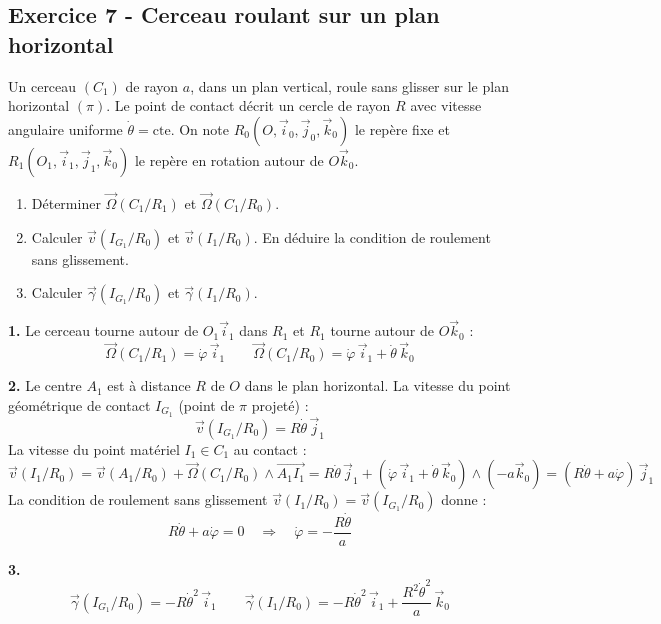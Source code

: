 \documentclass[12pt,a4paper]{article}
\begin{document}
\subsection*{Exercice 7 - Cerceau roulant sur un plan horizontal \niveau{\difficile}}

\begin{boiteexercice}
Un cerceau $(C_1)$ de rayon $a$, dans un plan vertical, roule sans glisser sur le plan horizontal $(\pi)$. Le point de contact décrit un cercle de rayon $R$ avec vitesse angulaire uniforme $\dot{\theta} = \mathrm{cte}$. On note $R_0(O,\vec{i}_0,\vec{j}_0,\vec{k}_0)$ le repère fixe et $R_1(O_1,\vec{i}_1,\vec{j}_1,\vec{k}_0)$ le repère en rotation autour de $O\vec{k}_0$.
\begin{enumerate}
  \item Déterminer $\vec{\Omega}(C_1/R_1)$ et $\vec{\Omega}(C_1/R_0)$.
  \item Calculer $\vec{v}(I_{G_1}/R_0)$ et $\vec{v}(I_1/R_0)$. En déduire la condition de roulement sans glissement.
  \item Calculer $\vec{\gamma}(I_{G_1}/R_0)$ et $\vec{\gamma}(I_1/R_0)$.
\end{enumerate}
\end{boiteexercice}

\begin{boitecorrige}
\textbf{1.} Le cerceau tourne autour de $O_1\vec{i}_1$ dans $R_1$ et $R_1$ tourne autour de $O\vec{k}_0$ :
\[
\vec{\Omega}(C_1/R_1) = \dot{\varphi}\,\vec{i}_1 \qquad \vec{\Omega}(C_1/R_0) = \dot{\varphi}\,\vec{i}_1 + \dot{\theta}\,\vec{k}_0
\]

\textbf{2.} Le centre $A_1$ est à distance $R$ de $O$ dans le plan horizontal. La vitesse du point géométrique de contact $I_{G_1}$ (point de $\pi$ projeté) :
\[
\vec{v}(I_{G_1}/R_0) = R\dot{\theta}\,\vec{j}_1
\]
La vitesse du point matériel $I_1 \in C_1$ au contact :
\[
\vec{v}(I_1/R_0) = \vec{v}(A_1/R_0) + \vec{\Omega}(C_1/R_0)\wedge\overrightarrow{A_1I_1} = R\dot{\theta}\,\vec{j}_1 + (\dot{\varphi}\,\vec{i}_1+\dot{\theta}\,\vec{k}_0)\wedge(-a\vec{k}_0) = (R\dot{\theta}+a\dot{\varphi})\,\vec{j}_1
\]
La condition de roulement sans glissement $\vec{v}(I_1/R_0) = \vec{v}(I_{G_1}/R_0)$ donne :
\[
\boxed{R\dot{\theta} + a\dot{\varphi} = 0 \quad\Rightarrow\quad \dot{\varphi} = -\frac{R\dot{\theta}}{a}}
\]

\textbf{3.}
\[
\vec{\gamma}(I_{G_1}/R_0) = -R\dot{\theta}^2\,\vec{i}_1 \qquad \vec{\gamma}(I_1/R_0) = -R\dot{\theta}^2\,\vec{i}_1 + \frac{R^2\dot{\theta}^2}{a}\,\vec{k}_0
\]
\end{boitecorrige}
\end{document}
